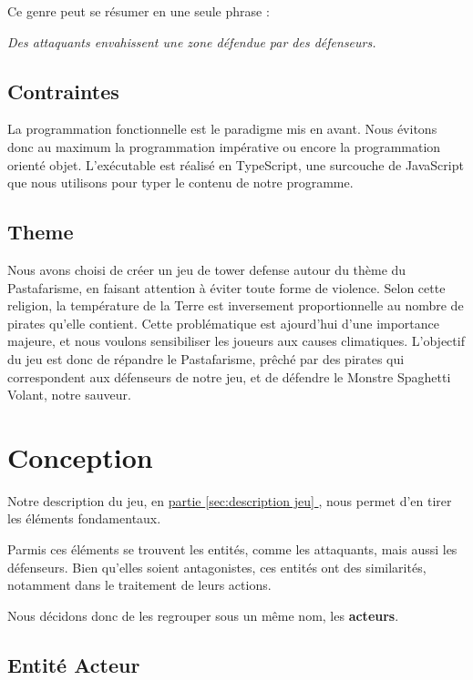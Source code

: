 \documentclass{article}
\begin{document}
Ce genre peut se résumer en une seule phrase :
\begin{center}
    \emph{Des attaquants envahissent une zone défendue par des défenseurs.}\label{sec:description jeu}
\end{center}

\subsection{Contraintes}

La programmation fonctionnelle est le paradigme mis en avant.
Nous évitons donc au maximum la programmation impérative ou encore la programmation orienté objet.
L'exécutable est réalisé en TypeScript, une surcouche de JavaScript que nous utilisons pour typer le contenu de notre programme.

\subsection{Theme}
Nous avons choisi de créer un jeu de tower defense autour du thème
du Pastafarisme, en faisant attention à éviter toute forme de violence.
Selon cette religion, la température de la Terre est inversement proportionnelle 
au nombre de pirates qu'elle contient.
Cette problématique est ajourd'hui d'une importance majeure, et nous voulons sensibiliser les joueurs aux causes climatiques.
L'objectif du jeu est donc de répandre le Pastafarisme, prêché par des pirates qui correspondent aux défenseurs de notre jeu, et de défendre le Monstre Spaghetti Volant, notre sauveur. 

\section{Conception}\label{sec:conception}

Notre description du jeu, en \hyperref[sec:description jeu]{partie \ref{sec:description jeu} }, nous permet d'en tirer les éléments fondamentaux.

Parmis ces éléments se trouvent les entités, comme les attaquants, mais aussi les défenseurs. Bien qu'elles soient antagonistes, ces entités ont des similarités, notamment dans le traitement de leurs actions. 

Nous décidons donc de les regrouper sous un même nom, les \textbf{acteurs}.


\subsection{Entité Acteur}
\end{document}
